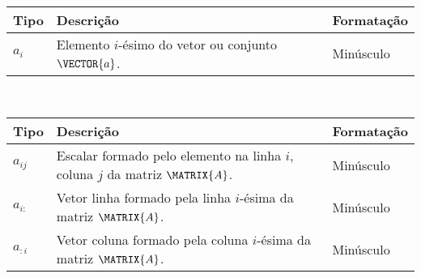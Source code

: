 \newpage
\begin{notation}~\\
\begin{tabular}{p{} | p{} | p{}}
\hline	
\textbf{Tipo} & \textbf{Descrição} & \textbf{Formatação} \\ \hline
$a_{i}$ & Elemento $i$-ésimo do vetor ou conjunto  $\VECTOR{a}$.& Minúsculo \\
\hline
\end{tabular}
\end{notation}


\begin{notation}~\\
\begin{tabular}{p{} | p{} | p{}}
\hline	
\textbf{Tipo} & \textbf{Descrição} & \textbf{Formatação} \\ \hline
$a_{ij}$ & Escalar formado pelo elemento na linha $i$, coluna $j$ da matriz $\MATRIX{A}$. & Minúsculo \\ \hline
$a_{i:}$ & Vetor linha formado pela linha $i$-ésima da matriz $\MATRIX{A}$.  & Minúsculo \\
$a_{:i}$ & Vetor coluna formado pela coluna $i$-ésima da matriz $\MATRIX{A}$.  & Minúsculo \\
\hline
\end{tabular}
\end{notation}


